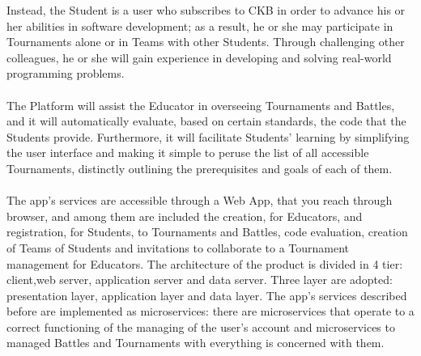 Instead, the Student is a user who subscribes to CKB in order to advance his or her abilities in software development; as a result, he or she may participate in Tournaments alone or in Teams with other Students. Through challenging 
other colleagues, he or she will gain experience in developing and solving real-world programming problems.\\
\\
The Platform will assist the Educator in overseeing Tournaments and Battles, and it will automatically evaluate, based on certain standards, the code that the Students provide. Furthermore, it will facilitate Students' learning by 
simplifying the user interface and making it simple to peruse the list of all accessible Tournaments, distinctly outlining the prerequisites and goals of each of them.\\
\\
The app's services are accessible through a Web App, that you reach through browser, and among them are included the creation, for Educators, and registration, for Students, to Tournaments and Battles, code evaluation, creation of Teams of Students and invitations 
to collaborate to a Tournament management for Educators. 
The architecture of the product is divided in 4 tier: client,web server, application server and data server. Three layer are adopted: presentation layer, application layer and data layer.
The app's services described before are implemented as microservices: there are microservices that operate to a correct functioning of the managing of the user's account and microservices to managed
Battles and Tournaments with everything is concerned with them.
